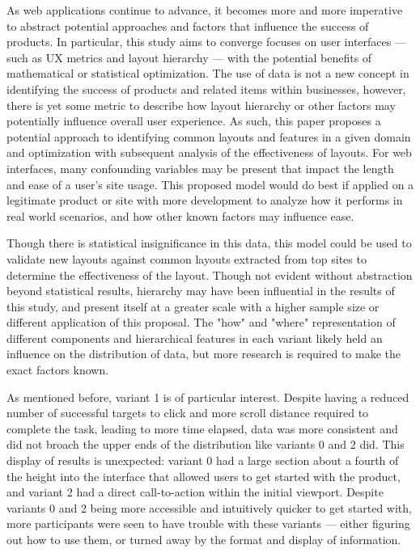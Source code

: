 \documentclass[conference]{IEEEtran}
\begin{document}
As web applications continue to advance, it becomes more and more imperative to abstract potential approaches and factors that influence the success of products. In particular, this study aims to converge focuses on user interfaces — such as UX metrics and layout hierarchy — with the potential benefits of mathematical or statistical optimization. The use of data is not a new concept in identifying the success of products and related items within businesses, however, there is yet some metric to describe how layout hierarchy or other factors may potentially influence overall user experience. As such, this paper proposes a potential approach to identifying common layouts and features in a given domain and optimization with subsequent analysis of the effectiveness of layouts. For web interfaces, many confounding variables may be present that impact the length and ease of a user's site usage. This proposed model would do best if applied on a legitimate product or site with more development to analyze how it performs in real world scenarios, and how other known factors may influence ease. 

Though there is statistical insignificance in this data, this model could be used to validate new layouts against common layouts extracted from top sites to determine the effectiveness of the layout. Though not evident without abstraction beyond statistical results, hierarchy may have been influential in the results of this study, and present itself at a greater scale with a higher sample size or different application of this proposal. The "how" and "where" representation of different components and hierarchical features in each variant likely held an influence on the distribution of data, but more research is required to make the exact factors known.

As mentioned before, variant 1 is of particular interest. Despite having a reduced number of successful targets to click and more scroll distance required to complete the task, leading to more time elapsed, data was more consistent and did not broach the upper ends of the distribution like variants 0 and 2 did. This display of results is unexpected: variant 0 had a large section about a fourth of the height into the interface that allowed users to get started with the product, and variant 2 had a direct call-to-action within the initial viewport. Despite variants 0 and 2 being more accessible and intuitively quicker to get started with, more participants were seen to have trouble with these variants — either figuring out how to use them, or turned away by the format and display of information.
\end{document}
